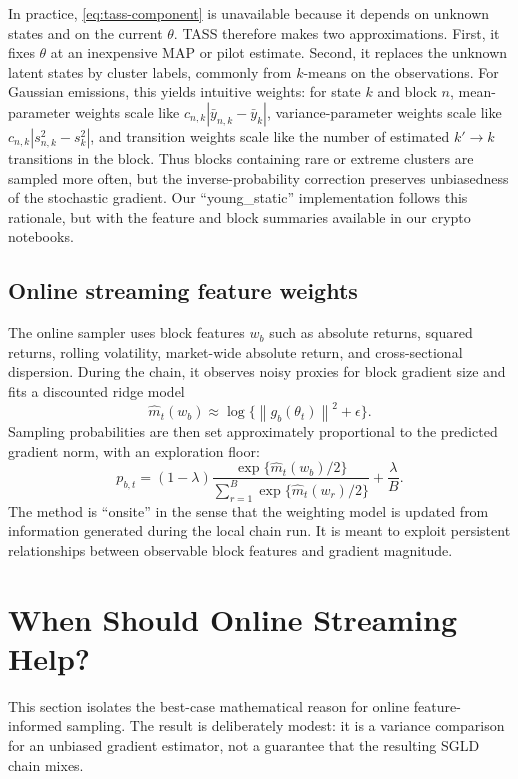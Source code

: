 \documentclass{article}
\newcommand{\1}{\mathbf{1}}
\newcommand{\norm}[1]{\left\lVert #1 \right\rVert}
\begin{document}
In practice, \eqref{eq:tass-component} is unavailable because it depends on unknown states and on the current $\theta$. TASS therefore makes two approximations. First, it fixes $\theta$ at an inexpensive MAP or pilot estimate. Second, it replaces the unknown latent states by cluster labels, commonly from $k$-means on the observations. For Gaussian emissions, this yields intuitive weights: for state $k$ and block $n$, mean-parameter weights scale like $c_{n,k}|\bar y_{n,k}-\bar y_k|$, variance-parameter weights scale like $c_{n,k}|s^2_{n,k}-s^2_k|$, and transition weights scale like the number of estimated $k'\to k$ transitions in the block. Thus blocks containing rare or extreme clusters are sampled more often, but the inverse-probability correction preserves unbiasedness of the stochastic gradient. Our ``young\_static'' implementation follows this rationale, but with the feature and block summaries available in our crypto notebooks.

\subsection{Online streaming feature weights}

The online sampler uses block features $w_b$ such as absolute returns, squared returns, rolling volatility, market-wide absolute return, and cross-sectional dispersion. During the chain, it observes noisy proxies for block gradient size and fits a discounted ridge model
\[
  \widehat m_t(w_b) \approx \log\{\norm{g_b(\theta_t)}^2+\epsilon\}.
\]
Sampling probabilities are then set approximately proportional to the predicted gradient norm, with an exploration floor:
\[
  p_{b,t}
  =
  (1-\lambda)\frac{\exp\{\widehat m_t(w_b)/2\}}
  {\sum_{r=1}^B \exp\{\widehat m_t(w_r)/2\}}
  + \frac{\lambda}{B}.
\]
The method is ``onsite'' in the sense that the weighting model is updated from information generated during the local chain run. It is meant to exploit persistent relationships between observable block features and gradient magnitude.

\section{When Should Online Streaming Help?}
\label{sec:when-useful}

This section isolates the best-case mathematical reason for online feature-informed sampling. The result is deliberately modest: it is a variance comparison for an unbiased gradient estimator, not a guarantee that the resulting SGLD chain mixes.
\end{document}
